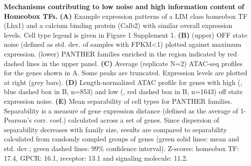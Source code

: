 \textbf{Mechanisms contributing to low noise and high information content of Homeobox TFs.} \textbf{(A)} Example expression patterns of a LIM class homeobox TF (Lhx1) and a calcium binding protein (Calb2) with similar overall expression levels. Cell type legend is given in Figure 1 Supplement 1. \textbf{(B)} (upper) OFF state noise (defined as std. dev. of samples with FPKM<1) plotted against maximum expression. (lower) PANTHER families enriched in the region indicated by red dashed lines in the upper panel. \textbf{(C)} Average (replicate N=2) ATAC-seq profiles for the genes shown in A. Some peaks are truncated. Expression levels are plotted at right (grey bars). \textbf{(D)} Length-normalized ATAC profile for genes with high (, blue dashed box in B, n=853) and low (, red dashed box in B, n=1643) off state expression noise. \textbf{(E)} Mean separability of cell types for PANTHER families. Separability is a measure of gene expression distance (defined as the average of 1- Pearson’s corr. coef.) calculated across a set of genes. Since dispersion of separability decreases with family size, results are compared to separability calculated from randomly sampled groups of genes (green solid lines: mean and std. dev.; green dashed lines: 99\% confidence interval). Z-scores: homeobox TF: 17.4, GPCR: 16.1, receptor: 13.1 and signaling molecule: 11.2.